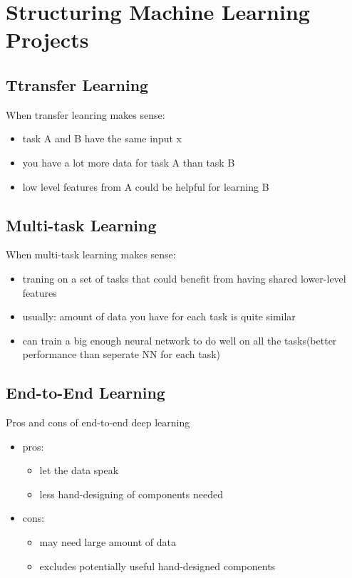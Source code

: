 \section{Structuring Machine Learning Projects}
\subsection{Ttransfer Learning}
When transfer leanring makes sense:
\begin{itemize}
\item task A and B have the same input x
\item you have a lot more data for task A than task B
\item low level features from A could be helpful for learning B
\end{itemize}

\subsection{Multi-task Learning}
When multi-task learning makes sense:
\begin{itemize}
\item traning on a set of tasks that could benefit from having shared lower-level features
\item usually: amount of data you have for each task is quite similar
\item can train a big enough neural network to do well on all the tasks(better performance than seperate NN for each task)
\end{itemize}

\subsection{End-to-End Learning}
Pros and cons of end-to-end deep learning
\begin{itemize}
\item pros:
	\begin{itemize}
	\item let the data speak
	\item less hand-designing of components needed
	\end{itemize}
\item cons:
	\begin{itemize}
	\item may need large amount of data
	\item excludes potentially useful hand-designed components
	\end{itemize}
\end{itemize}

